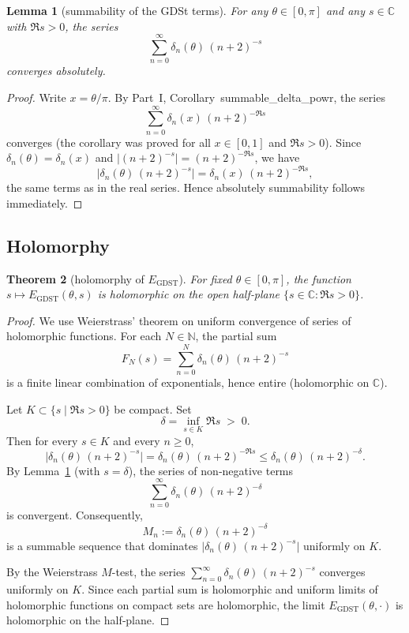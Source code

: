 \documentclass[11pt,a4paper]{article}
\newtheorem{theorem}{Theorem}[section]
\newtheorem{lemma}[theorem]{Lemma}
\theoremstyle{definition}
\theoremstyle{remark}
\newcommand{\N}{\mathbb{N}}
\newcommand{\C}{\mathbb{C}}
\newcommand{\abs}[1]{\lvert#1\rvert}
\newcommand{\GDST}{\operatorname{GDST}}
\begin{document}
\begin{lemma}[summability of the GDSt terms]\label{lem:summ_GDST}
For any \(\theta\in[0,\pi]\) and any \(s\in\C\) with \(\Re s>0\), the series
\[
\sum_{n=0}^{\infty} \delta_n(\theta)\,(n+2)^{-s}
\]
converges absolutely.
\end{lemma}
\begin{proof}
Write \(x=\theta/\pi\). By Part~I, Corollary~summable\_delta\_powr, the series
\[
\sum_{n=0}^{\infty} \delta_n(x)\,(n+2)^{-\Re s}
\]
converges (the corollary was proved for all \(x\in[0,1]\) and \(\Re s>0\)). 
Since \(\delta_n(\theta)=\delta_n(x)\) and \(\abs{(n+2)^{-s}} = (n+2)^{-\Re s}\), we have
\[
\abs{\delta_n(\theta)\,(n+2)^{-s}} = \delta_n(x)\,(n+2)^{-\Re s},
\]
the same terms as in the real series. Hence absolutely summability follows immediately.
\end{proof}

\subsection{Holomorphy}

\begin{theorem}[holomorphy of \(E_{\GDST}\)]\label{thm:holo}
For fixed \(\theta\in[0,\pi]\), the function \(s\mapsto E_{\GDST}(\theta,s)\) is holomorphic on the open half‑plane \(\{s\in\C : \Re s>0\}\).
\end{theorem}
\begin{proof}
We use Weierstrass’ theorem on uniform convergence of series of holomorphic functions.
For each \(N\in\N\), the partial sum
\[
F_N(s) = \sum_{n=0}^{N} \delta_n(\theta)\,(n+2)^{-s}
\]
is a finite linear combination of exponentials, hence entire (holomorphic on \(\C\)).

Let \(K\subset\{s\mid\Re s>0\}\) be compact. Set
\[
\delta = \inf_{s\in K}\Re s \;>\;0.
\]
Then for every \(s\in K\) and every \(n\ge0\),
\[
\abs{\delta_n(\theta)\,(n+2)^{-s}} = \delta_n(\theta)\,(n+2)^{-\Re s} \le \delta_n(\theta)\,(n+2)^{-\delta}.
\]
By Lemma~\ref{lem:summ_GDST} (with \(s=\delta\)), the series of non‑negative terms
\[
\sum_{n=0}^{\infty} \delta_n(\theta)\,(n+2)^{-\delta}
\]
is convergent. Consequently,
\[
M_n := \delta_n(\theta)\,(n+2)^{-\delta}
\]
is a summable sequence that dominates \(\abs{\delta_n(\theta)\,(n+2)^{-s}}\) uniformly on \(K\).

By the Weierstrass \(M\)-test, the series \(\sum_{n=0}^{\infty} \delta_n(\theta)\,(n+2)^{-s}\) converges uniformly on \(K\). Since each partial sum is holomorphic and uniform limits of holomorphic functions on compact sets are holomorphic, the limit \(E_{\GDST}(\theta,\cdot)\) is holomorphic on the half‑plane.
\end{proof}
\end{document}
